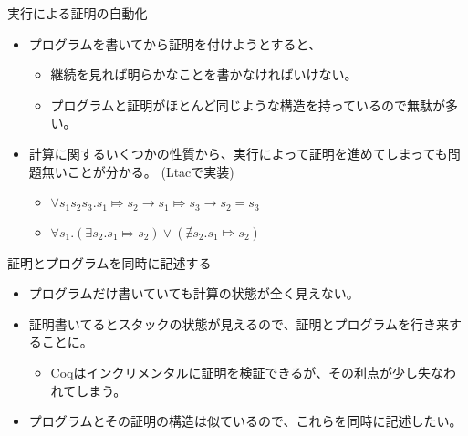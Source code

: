 \documentclass[cjk, 12pt]{beamer}
\begin{document}
\begin{frame}{実行による証明の自動化}

 \begin{itemize}
  \item プログラムを書いてから証明を付けようとすると、
	\begin{itemize}
	 \item 継続を見れば明らかなことを書かなければいけない。
	 \item プログラムと証明がほとんど同じような構造を持っているので無駄が多い。
	\end{itemize}
  \item 計算に関するいくつかの性質から、実行によって証明を進めてしまっても問題無いことが分かる。
	(Ltacで実装)
	\begin{itemize}
	 \item $\forall s_1 s_2 s_3. s_1 \Mapsto s_2 \to s_1 \Mapsto s_3 \to s_2 = s_3$
	 \item $\forall s_1. (\exists s_2. s_1 \Mapsto s_2) \vee (\nexists s_2. s_1 \Mapsto s_2)$
	\end{itemize}
 \end{itemize}

\end{frame}

\begin{frame}{証明とプログラムを同時に記述する}

 \begin{itemize}
  \item プログラムだけ書いていても計算の状態が全く見えない。
  \item 証明書いてるとスタックの状態が見えるので、証明とプログラムを行き来することに。
	\begin{itemize}
	 \item Coqはインクリメンタルに証明を検証できるが、その利点が少し失なわれてしまう。
	\end{itemize}
  \item プログラムとその証明の構造は似ているので、これらを同時に記述したい。
 \end{itemize}

\end{frame}
\end{document}
